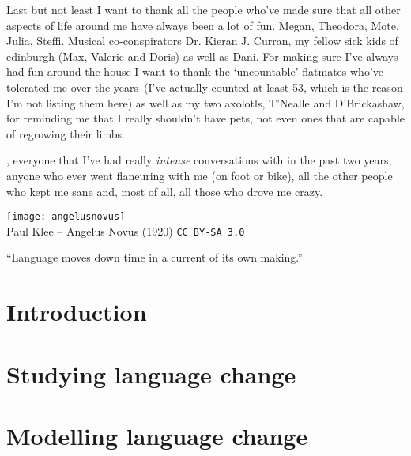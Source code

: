 \documentclass[oneside]{book}
\begin{document}
Last but not least I want to thank all the people who've made sure that all other aspects of life around me have always been a lot of fun. Megan, Theodora, Mote, Julia, Steffi.
Musical co-conspirators Dr. Kieran J. Curran, my fellow sick kids of edinburgh (Max, Valerie and Doris) as well as Dani. %
For making sure I've always had fun around the house I want to thank the `uncountable' flatmates who've tolerated me over the years~(I've actually counted at least 53, which is the reason I'm not listing them here) as well as my two axolotls, T'Nealle and D'Brickashaw, for reminding me that I really shouldn't have pets, not even ones that are capable of regrowing their limbs.

, everyone that I've had really \emph{intense} conversations with in the past two years, anyone who ever went flaneuring with me (on foot or bike), all the other people who kept me sane and, most of all, all those who drove me crazy.
\vfill
\begin{center}
\texttt{[image: angelusnovus]}\\
\footnotesize Paul Klee -- Angelus Novus (1920) \texttt{CC BY-SA 3.0}
\end{center}

\tableofcontents

\listoffigures
\listoftables

\newpage
\thispagestyle{empty}
\epigraph{``Language moves down time in a current of its own making.''}{\citep[p.160]{Sapir1921}}

\mainmatter

\chapter{Introduction}
\label{ch:intro}


\chapter{Studying language change}
\label{ch:review}


\chapter{Modelling language change}
\label{ch:modelling}


\end{document}
